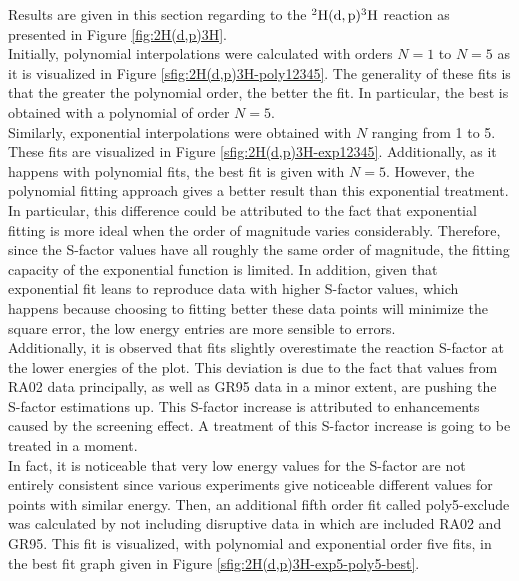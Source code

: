 \documentclass[openany]{book}
\begin{document}
Results are given in this section regarding to the $\mathrm{{}^{2}H(d, p){}^{3}H}$ reaction as presented in Figure \ref{fig:2H(d,p)3H}. \\ 

Initially, polynomial interpolations were calculated with orders $N = 1$ to $N = 5$ as it is visualized in Figure \ref{sfig:2H(d,p)3H-poly12345}. The generality of these fits is that the greater the polynomial order, the better the fit. In particular, the best is obtained with a polynomial of order $N = 5$.  \\

Similarly, exponential interpolations were obtained with $N$ ranging from 1 to 5. These fits are visualized in Figure \ref{sfig:2H(d,p)3H-exp12345}. Additionally, as it happens with polynomial fits, the best fit is given with $N = 5$. However, the polynomial fitting approach gives a better result than this exponential treatment. \\

In particular, this difference could be attributed to the fact that exponential fitting is more ideal when the order of magnitude varies considerably. Therefore, since the S-factor values have all roughly the same order of magnitude, the fitting capacity of the exponential function is limited. In addition, given that exponential fit leans to reproduce data with higher S-factor values, which happens because choosing to fitting better these data points will minimize the square error, the low energy entries are more sensible to errors.  \\

Additionally, it is observed that fits slightly overestimate the reaction S-factor at the lower energies of the plot. This deviation is due to the fact that values from RA02 data principally, as well as GR95 data in a minor extent, are pushing the S-factor estimations up. This S-factor increase is attributed to enhancements caused by the screening effect. A treatment of this S-factor increase is going to be treated in a moment. \\

 In fact, it is noticeable that very low energy values for the S-factor are not entirely consistent since various experiments give noticeable different values for points with similar energy. Then, an additional fifth order fit called poly5-exclude was calculated by not including disruptive data in which are included RA02 and GR95. This fit is visualized, with polynomial and exponential order five fits, in the best fit graph given in Figure \ref{sfig:2H(d,p)3H-exp5-poly5-best}.
\end{document}
